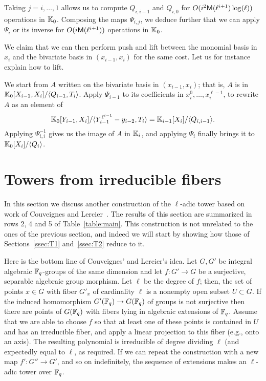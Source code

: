 \documentclass{sig-alternate}
\begin{document}
Taking $j=i,\dots,1$ allows us to compute $Q_{i,i-1}$ and $Q_{i,0}$
for $O(i^2\mathsf{M}(\ell^{i+1})\log(\ell))$ operations in $\mathbb{K}_0$. Composing
the maps $\Psi_{i,j}$, we deduce further that we can apply $\Psi_i$ or
its inverse for $O(i\mathsf{M}(\ell^{i+1}))$ operations in $\mathbb{K}_0$.  

We claim that we can then perform push and lift between the monomial
basis in $x_i$ and the bivariate basis in $(x_{i-1},x_i)$ for the same
cost. Let us for instance explain how to lift.

We start from $A$ written on the bivariate basis in $(x_{i-1},x_i)$;
that is, $A$ is in $\mathbb{K}_0[X_{i-1},X_i]/\langle Q_{i-1},
T_{i}\rangle$. Apply $\Psi_{i-1}$ to its coefficients in
$x_i^0,\dots,x_i^{\ell-1}$, to rewrite $A$ as an element of
$$\mathbb{K}_0[Y_{i-1},X_i]/\langle Y_{i-1}^{\ell^{i-1}}-y_{i-2},
T_{i}\rangle = \mathbb{K}_{i-1}[X_i]/\langle Q_{i,i-1} \rangle.$$ Applying
$\Psi_{i,i}^{-1}$ gives us the image of $A$ in $\mathbb{K}_i$, and applying
$\Psi_i$ finally brings it to $\mathbb{K}_0[X_i]/\langle Q_{i}\rangle$.



\section{Towers from irreducible fibers}
\label{sec:fibers}

In this section we discuss another construction of the $\ell$-adic
tower based on work of Couveignes and
Lercier~\cite{couveignes+lercier11}. The results of this section are
summarized in rows 2, 4 and 5 of Table~\ref{table:main}. This
construction is not unrelated to the ones of the previous section, and
indeed we will start by showing how those of Sections~\ref{ssec:T1}
and~\ref{ssec:T2} reduce to it.

Here is the bottom line of Couveignes' and Lercier's idea. Let $G, G'$
be integral algebraic $\mathbb{F}_q$-groups of the same dimension and let $f:
G' \rightarrow G$ be a surjective, separable algebraic group morphism.
Let $\ell$ be the degree of $f$; then, the set of points $x \in G$
with fiber $G'_x$ of cardinality $\ell$ is a nonempty open subset $U
\subset G$. If the induced homomorphism $G'(\mathbb{F}_q) \rightarrow G(\mathbb{F}_q)$
of groups is not surjective then there are points of $G(\mathbb{F}_q)$ with
fibers lying in algebraic extensions of $\mathbb{F}_q$. Assume that we are able
to choose $f$ so that at least one of these points is contained in $U$
and has an irreducible fiber, and apply a linear projection to this
fiber (e.g., onto an axis). The resulting polynomial is irreducible of
degree dividing $\ell$ (and expectedly equal to $\ell$, as
required. If we can repeat the construction with a new map $f':G''\to
G'$, and so on indefinitely, the sequence of extensions makes an
$\ell$-adic tower over $\mathbb{F}_q$.
\end{document}
